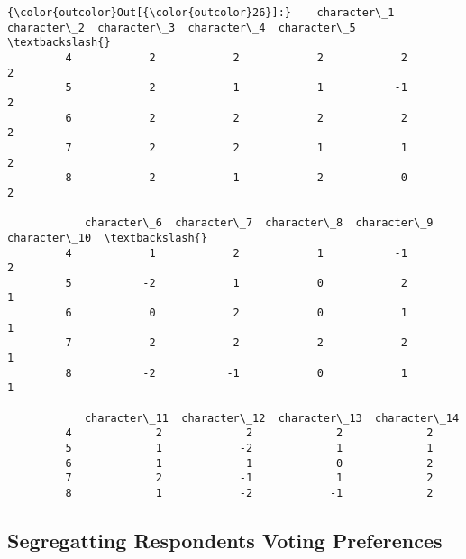 \documentclass[11pt]{article}
\begin{document}
\begin{Verbatim}[commandchars=\\\{\}]
{\color{outcolor}Out[{\color{outcolor}26}]:}    character\_1  character\_2  character\_3  character\_4  character\_5  \textbackslash{}
         4            2            2            2            2            2   
         5            2            1            1           -1            2   
         6            2            2            2            2            2   
         7            2            2            1            1            2   
         8            2            1            2            0            2   
         
            character\_6  character\_7  character\_8  character\_9  character\_10  \textbackslash{}
         4            1            2            1           -1             2   
         5           -2            1            0            2             1   
         6            0            2            0            1             1   
         7            2            2            2            2             1   
         8           -2           -1            0            1             1   
         
            character\_11  character\_12  character\_13  character\_14  
         4             2             2             2             2  
         5             1            -2             1             1  
         6             1             1             0             2  
         7             2            -1             1             2  
         8             1            -2            -1             2  
\end{Verbatim}
            
    \subsection{Segregatting Respondents Voting
Preferences}\label{segregatting-respondents-voting-preferences}
\end{document}
